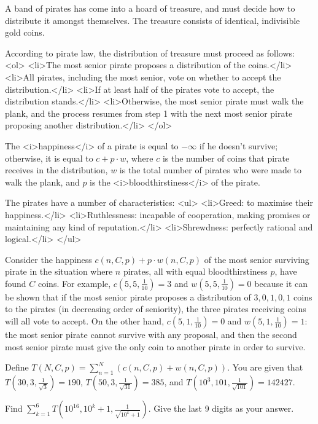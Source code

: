 A band of pirates has come into a hoard of treasure, and must decide how to distribute it amongst themselves. The treasure consists of identical, indivisible gold coins.

According to pirate law, the distribution of treasure must proceed as follows:
<ol>
<li>The most senior pirate proposes a distribution of the coins.</li>
<li>All pirates, including the most senior, vote on whether to accept the distribution.</li>
<li>If at least half of the pirates vote to accept, the distribution stands.</li>
<li>Otherwise, the most senior pirate must walk the plank, and the process resumes from step 1 with the next most senior pirate proposing another distribution.</li>
</ol>

The <i>happiness</i> of a pirate is equal to $-\infty$ if he doesn't survive; otherwise, it is equal to $c + p\cdot w$, where $c$ is the number of coins that pirate receives in the distribution, $w$ is the total number of pirates who were made to walk the plank, and $p$ is the <i>bloodthirstiness</i> of the pirate.

The pirates have a number of characteristics:
<ul>
<li>Greed: to maximise their happiness.</li>
<li>Ruthlessness: incapable of cooperation, making promises or maintaining any kind of reputation.</li>
<li>Shrewdness: perfectly rational and logical.</li>
</ul>

Consider the happiness $c(n,C,p) + p\cdot w(n,C,p)$ of the most senior surviving pirate in the situation where $n$ pirates, all with equal bloodthirstiness $p$, have found $C$ coins. For example, $c(5,5,\frac{1}{10}) = 3$ and $w(5,5,\frac{1}{10})=0$ because it can be shown that if the most senior pirate proposes a distribution of $3,0,1,0,1$ coins to the pirates (in decreasing order of seniority), the three pirates receiving coins will all vote to accept. On the other hand, $c(5,1,\frac{1}{10}) = 0$ and $w(5,1,\frac{1}{10}) = 1$: the most senior pirate cannot survive with any proposal, and then the second most senior pirate must give the only coin to another pirate in order to survive.

Define $\displaystyle T(N,C,p) = \sum_{n=1}^N \left ( c(n,C,p) + w(n,C,p) \right )$. You are given that $T(30,3,\frac{1}{\sqrt{3}}) = 190$, $T(50,3,\frac{1}{\sqrt{31}}) = 385$, and $T(10^3, 101, \frac{1}{\sqrt{101}}) = 142427$.

Find $\displaystyle \sum_{k=1}^6 T(10^{16},10^k+1,\tfrac{1}{\sqrt{10^k+1}})$.  Give the last 9 digits as your answer.

